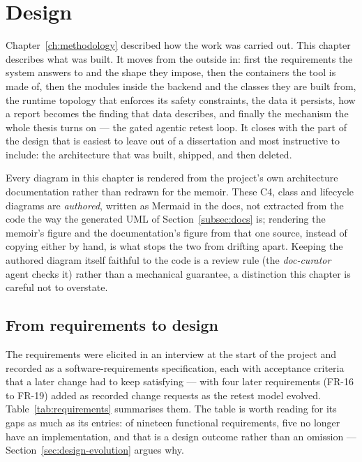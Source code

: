 \chapter{Design}
\label{ch:design}

Chapter~\ref{ch:methodology} described how the work was carried out. This chapter
describes what was built. It moves from the outside in: first the requirements the
system answers to and the shape they impose, then the containers the tool is made
of, then the modules inside the backend and the classes they are built from, the
runtime topology that enforces its safety constraints, the data it persists, how a
report becomes the finding that data describes, and finally the mechanism the whole
thesis turns on --- the gated agentic retest loop. It closes with the part of the
design that is easiest to leave out of a dissertation and most instructive to
include: the architecture that was built, shipped, and then deleted.

Every diagram in this chapter is rendered from the project's own architecture
documentation rather than redrawn for the memoir. These C4, class and lifecycle
diagrams are \emph{authored}, written as Mermaid in the docs, not extracted
from the code the way the generated UML of Section~\ref{subsec:docs} is; rendering
the memoir's figure and the documentation's figure from that one source, instead of
copying either by hand, is what stops the two from drifting apart. Keeping the
authored diagram itself faithful to the code is a review rule (the
\emph{doc-curator} agent checks it) rather than a mechanical guarantee, a
distinction this chapter is careful not to overstate.

\section{From requirements to design}
\label{sec:design-requirements}

The requirements were elicited in an interview at the start of the project and
recorded as a software-requirements specification, each with acceptance criteria
that a later change had to keep satisfying --- with four later requirements
(FR-16 to FR-19) added as recorded change requests as the retest model evolved.
Table~\ref{tab:requirements}
summarises them. The table is worth reading for its gaps as much as its entries:
of nineteen functional requirements, five no longer have an implementation, and
that is a design outcome rather than an omission --- Section~\ref{sec:design-evolution}
argues why.

